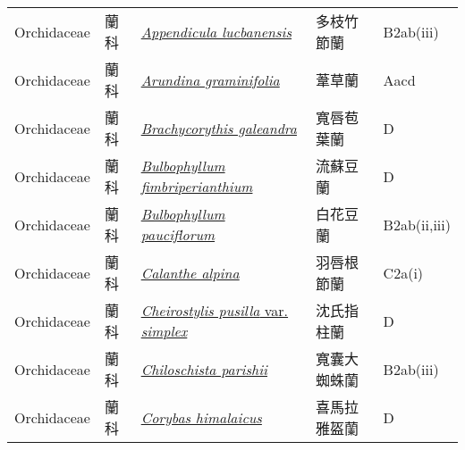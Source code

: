 {\begin{longtable}{p{2.5cm}p{2cm}p{5cm}p{2.5cm}p{3cm}}
    Orchidaceae & 蘭科 & \href{http://www.theplantlist.org/tpl1.1/search?q=Appendicula+lucbanensis}{\textit{Appendicula lucbanensis} } & 多枝竹節蘭 & B2ab(iii) \index{Appendicula@\textit{Appendicula}!lucbanensis@\textit{lucbanensis}}  \index{多枝竹節蘭} \\
    Orchidaceae & 蘭科 & \href{http://www.theplantlist.org/tpl1.1/search?q=Arundina+graminifolia}{\textit{Arundina graminifolia} } & 葦草蘭 & Aacd \index{Arundina@\textit{Arundina}!graminifolia@\textit{graminifolia}}  \index{葦草蘭} \\
    Orchidaceae & 蘭科 & \href{http://www.theplantlist.org/tpl1.1/search?q=Brachycorythis+galeandra}{\textit{Brachycorythis galeandra} } & 寬唇苞葉蘭 & D \index{Brachycorythis@\textit{Brachycorythis}!galeandra@\textit{galeandra}}  \index{寬唇苞葉蘭} \\
    Orchidaceae & 蘭科 & \href{http://www.theplantlist.org/tpl1.1/search?q=Bulbophyllum+fimbriperianthium}{\textit{Bulbophyllum fimbriperianthium} } & 流蘇豆蘭 & D \index{Bulbophyllum@\textit{Bulbophyllum}!fimbriperianthium@\textit{fimbriperianthium}}  \index{流蘇豆蘭} \\
    Orchidaceae & 蘭科 & \href{http://www.theplantlist.org/tpl1.1/search?q=Bulbophyllum+pauciflorum}{\textit{Bulbophyllum pauciflorum} } & 白花豆蘭 & B2ab(ii,iii) \index{Bulbophyllum@\textit{Bulbophyllum}!pauciflorum@\textit{pauciflorum}}  \index{白花豆蘭} \\
    Orchidaceae & 蘭科 & \href{http://www.theplantlist.org/tpl1.1/search?q=Calanthe+alpina}{\textit{Calanthe alpina} } & 羽唇根節蘭 & C2a(i) \index{Calanthe@\textit{Calanthe}!alpina@\textit{alpina}}  \index{羽唇根節蘭} \\
    Orchidaceae & 蘭科 & \href{http://www.theplantlist.org/tpl1.1/search?q=Cheirostylis+pusilla+var.+simplex}{\textit{Cheirostylis pusilla} var. \textit{simplex} } & 沈氏指柱蘭 & D \index{Cheirostylis@\textit{Cheirostylis}!pusilla@\textit{pusilla}!var. simplex@var. \textit{simplex}}  \index{沈氏指柱蘭} \\
    Orchidaceae & 蘭科 & \href{http://www.theplantlist.org/tpl1.1/search?q=Chiloschista+parishii}{\textit{Chiloschista parishii} } & 寬囊大蜘蛛蘭 & B2ab(iii) \index{Chiloschista@\textit{Chiloschista}!parishii@\textit{parishii}}  \index{寬囊大蜘蛛蘭} \\
    Orchidaceae & 蘭科 & \href{http://www.theplantlist.org/tpl1.1/search?q=Corybas+himalaicus}{\textit{Corybas himalaicus} } & 喜馬拉雅盔蘭 & D \index{Corybas@\textit{Corybas}!himalaicus@\textit{himalaicus}}  \index{喜馬拉雅盔蘭} \\

\end{longtable}}
